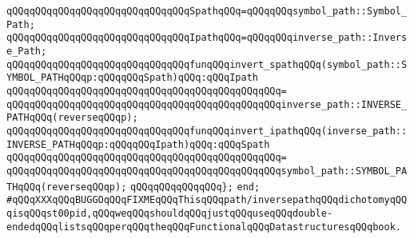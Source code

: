 \newline
\verb|qQQqqQQqqQQqqQQqqQQqqQQqqQQqqQQqSpathqQQq=qQQqqQQqsymbol_path::Symbol_Path;|\newline
\verb|qQQqqQQqqQQqqQQqqQQqqQQqqQQqqQQqIpathqQQq=qQQqqQQqinverse_path::Inverse_Path;|\newline
\newline
\verb|qQQqqQQqqQQqqQQqqQQqqQQqqQQqqQQqfunqQQqinvert_spathqQQq(symbol_path::SYMBOL_PATHqQQqp:qQQqqQQqSpath)qQQq:qQQqIpath|\newline
\verb|qQQqqQQqqQQqqQQqqQQqqQQqqQQqqQQqqQQqqQQqqQQqqQQq=|\newline
\verb|qQQqqQQqqQQqqQQqqQQqqQQqqQQqqQQqqQQqqQQqqQQqqQQqinverse_path::INVERSE_PATHqQQq(reverseqQQqp);|\newline
\newline
\verb|qQQqqQQqqQQqqQQqqQQqqQQqqQQqqQQqfunqQQqinvert_ipathqQQq(inverse_path::INVERSE_PATHqQQqp:qQQqqQQqIpath)qQQq:qQQqSpath|\newline
\verb|qQQqqQQqqQQqqQQqqQQqqQQqqQQqqQQqqQQqqQQqqQQqqQQq=|\newline
\verb|qQQqqQQqqQQqqQQqqQQqqQQqqQQqqQQqqQQqqQQqqQQqqQQqsymbol_path::SYMBOL_PATHqQQq(reverseqQQqp);|\newline
\newline
\verb|qQQqqQQqqQQqqQQq};|\newline
\verb|end;|\newline
\newline
\verb|#qQQqXXXqQQqBUGGOqQQqFIXMEqQQqThisqQQqpath/inversepathqQQqdichotomyqQQqisqQQqst00pid,qQQqweqQQqshouldqQQqjustqQQquseqQQqdouble-endedqQQqlistsqQQqperqQQqtheqQQqFunctionalqQQqDatastructuresqQQqbook.|\newline
\newline

